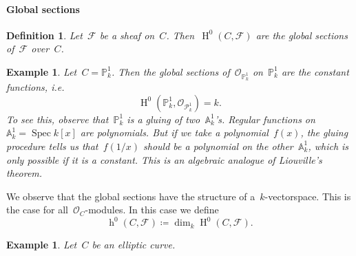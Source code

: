 \documentclass[10pt,a4paper]{article}
\theoremstyle{lecture}
\newtheorem{definition}[theorem]{Definition}
\newtheorem{example}[theorem]{Example}
\newcommand\dash{\nobreakdash-\hspace{0pt}}
\DeclareMathOperator\hh{h}
\DeclareMathOperator\HH{H}
\DeclareMathOperator\Spec{Spec}
\begin{document}
\paragraph{Global sections}
\begin{definition}
  Let~$\mathcal{F}$ be a sheaf on~$C$. Then~$\HH^0(C,\mathcal{F})$ are the \emph{global sections} of~$\mathcal{F}$ over~$C$.
\end{definition}
\begin{example}
  Let~$C=\mathbb{P}_k^1$. Then the global sections of~$\mathcal{O}_{\mathbb{P}_k^1}$ on~$\mathbb{P}_k^1$ are the constant functions, i.e.
  \begin{equation}
    \HH^0(\mathbb{P}_k^1,\mathcal{O}_{\mathcal{P}_k^1})=k.
  \end{equation}
  To see this, observe that~$\mathbb{P}_k^1$ is a gluing of two~$\mathbb{A}_k^1$'s. Regular functions on~$\mathbb{A}_k^1=\Spec k[x]$ are polynomials. But if we take a polynomial~$f(x)$, the gluing procedure tells us that~$f(1/x)$ should be a polynomial on the other~$\mathbb{A}_k^1$, which is only possible if it is a constant. This is an algebraic analogue of \emph{Liouville's theorem}.
\end{example}
We observe that the global sections have the structure of a~$k$\dash vectorspace. This is the case for all~$\mathcal{O}_C$\dash modules. In this case we define
\begin{equation}
  \hh^0(C,\mathcal{F})\coloneqq\dim_k\HH^0(C,\mathcal{F}).
\end{equation}
\begin{example}
  Let~$C$ be an elliptic curve\expand.
\end{example}
\end{document}
